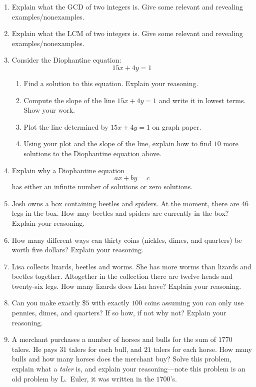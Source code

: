 \begin{problems}

\begin{enumerate}
\item Explain what the GCD of two integers is. Give some relevant and
  revealing examples/nonexamples.
\item Explain what the LCM of two integers is. Give some relevant and
  revealing examples/nonexamples.
\item Consider the Diophantine equation:
\[
15x + 4y = 1
\]
\begin{enumerate}
\item Find a solution to this equation. Explain your reasoning.
\item Compute the slope of the line $15x + 4y = 1$ and write it in
  lowest terms. Show your work.
\item Plot the line determined by $15x + 4y = 1$ on graph paper.
\item Using your plot and the slope of the line, explain how to find
  $10$ more solutions to the Diophantine equation above.
\end{enumerate}
\item Explain why a Diophantine equation 
\[
ax + by = c
\]
has either an infinite number of solutions or zero solutions.
\item Josh owns a box containing beetles and spiders. At the moment,
  there are $46$ legs in the box. How may beetles and spiders are
  currently in the box? Explain your reasoning.
\item How many different ways can thirty coins (nickles, dimes, and
  quarters) be worth five dollars? Explain your reasoning.
\item Lisa collects lizards, beetles and worms. She has more worms
  than lizards and beetles together. Altogether in the collection
  there are twelve heads and twenty-six legs. How many lizards does
  Lisa have?  Explain your reasoning.
\item Can you make exactly \$$5$ with exactly $100$ coins assuming you
  can only use pennies, dimes, and quarters? If so how, if not why
  not?  Explain your reasoning.
\item A merchant purchases a number of horses and bulls for the sum
  of $1770$ talers. He pays $31$ talers for each bull, and $21$ talers
  for each horse. How many bulls and how many horses does the merchant
  buy? Solve this problem, explain what a \textit{taler} is, and
  explain your reasoning---note this problem is an old problem by
  L.\ Euler, it was written in the $1700$'s.

\end{enumerate}
\end{problems}

